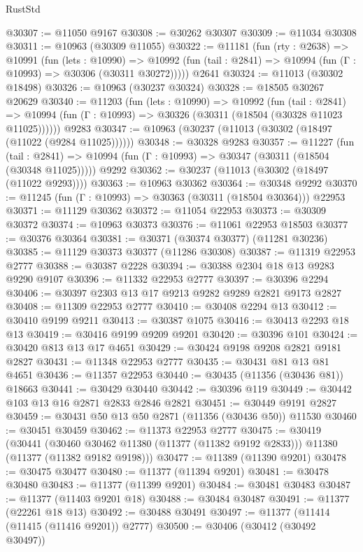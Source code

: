 \begin{lexlean}{RustStd}
\begin{coremodule}
@30307 := @11050 @9167
@30308 := @30262 @30307
@30309 := @11034 @30308
@30311 := @10963 (@30309 @11055)
@30322 := @11181
    (fun (rty : @2638) =>
    @10991
      (fun (lets : @10990) =>
      @10992 (fun (tail : @2841) => @10994 (fun (Γ : @10993) => @30306 (@30311 @30272)))))
    @2641
@30324 := @11013 (@30302 @18498)
@30326 := @10963 (@30237 @30324)
@30328 := @18505 @30267 @20629
@30340 := @11203
    (fun (lets : @10990) =>
    @10992
      (fun (tail : @2841) =>
      @10994 (fun (Γ : @10993) => @30326 (@30311 (@18504 (@30328 @11023 @11025))))))
    @9283
@30347 := @10963 (@30237 (@11013 (@30302 (@18497 (@11022 (@9284 @11025))))))
@30348 := @30328 @9283
@30357 := @11227
    (fun (tail : @2841) => @10994 (fun (Γ : @10993) => @30347 (@30311 (@18504 (@30348 @11025)))))
    @9292
@30362 := @30237 (@11013 (@30302 (@18497 (@11022 @9293))))
@30363 := @10963 @30362
@30364 := @30348 @9292
@30370 := @11245 (fun (Γ : @10993) => @30363 (@30311 (@18504 @30364))) @22953
@30371 := @11129 @30362
@30372 := @11054 @22953
@30373 := @30309 @30372
@30374 := @10963 @30373
@30376 := @11061 @22953 @18503
@30377 := @30376 @30364
@30381 := @30371 (@30374 @30377) (@11281 @30236)
@30385 := @11129 @30373 @30377 (@11286 @30308)
@30387 := @11319 @22953 @2777
@30388 := @30387 @2228
@30394 := @30388 @2304 @18 @13 @9283 @9290 @9107
@30396 := @11332 @22953 @2777
@30397 := @30396 @2294
@30406 := @30397 @2303 @13 @17 @9213 @9282 @9289 @2821 @9173 @2827
@30408 := @11309 @22953 @2777
@30410 := @30408 @2294 @13
@30412 := @30410 @9199 @9211
@30413 := @30387 @1075
@30416 := @30413 @2293 @18 @13
@30419 := @30416 @9199 @9209 @9201
@30420 := @30396 @101
@30424 := @30420 @813 @13 @17 @4651
@30429 := @30424 @9198 @9208 @2821 @9181 @2827
@30431 := @11348 @22953 @2777
@30435 := @30431 @81 @13 @81 @4651
@30436 := @11357 @22953
@30440 := @30435 (@11356 (@30436 @81)) @18663
@30441 := @30429 @30440
@30442 := @30396 @119
@30449 := @30442 @103 @13 @16 @2871 @2833 @2846 @2821
@30451 := @30449 @9191 @2827
@30459 := @30431 @50 @13 @50 @2871 (@11356 (@30436 @50)) @11530
@30460 := @30451 @30459
@30462 := @11373 @22953 @2777
@30475 := @30419
    (@30441
      (@30460 @30462 @11380 (@11377 (@11382 @9192 @2833)))
      @11380
      (@11377 (@11382 @9182 @9198)))
@30477 := @11389 (@11390 @9201)
@30478 := @30475 @30477
@30480 := @11377 (@11394 @9201)
@30481 := @30478 @30480
@30483 := @11377 (@11399 @9201)
@30484 := @30481 @30483
@30487 := @11377 (@11403 @9201 @18)
@30488 := @30484 @30487
@30491 := @11377 (@22261 @18 @13)
@30492 := @30488 @30491
@30497 := @11377 (@11414 (@11415 (@11416 @9201)) @2777)
@30500 := @30406 (@30412 (@30492 @30497))

\end{coremodule}
\end{lexlean}
